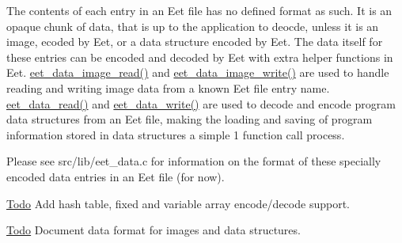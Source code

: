 The contents of each entry in an Eet file has no defined format as such. It is an opaque chunk of data, that is up to the application to deocde, unless it is an image, ecoded by Eet, or a data structure encoded by Eet. The data itself for these entries can be encoded and decoded by Eet with extra helper functions in Eet. \hyperlink{Eet_8h_986872ec682c29f842b2ef6dad810257}{eet\_\-data\_\-image\_\-read()} and \hyperlink{Eet_8h_b4e8a3419744fac22bca24af533f5051}{eet\_\-data\_\-image\_\-write()} are used to handle reading and writing image data from a known Eet file entry name. \hyperlink{Eet_8h_4d1807cbbc448304f22a8808318a3429}{eet\_\-data\_\-read()} and \hyperlink{Eet_8h_c66d1c49e3490bc5d803982d833ff8aa}{eet\_\-data\_\-write()} are used to decode and encode program data structures from an Eet file, making the loading and saving of program information stored in data structures a simple 1 function call process.

Please see src/lib/eet\_\-data.c for information on the format of these specially encoded data entries in an Eet file (for now).

\begin{Desc}
\item[\hyperlink{todo__todo000001}{Todo}]Add hash table, fixed and variable array encode/decode support. \end{Desc}
\begin{Desc}
\item[\hyperlink{todo__todo000001}{Todo}]Document data format for images and data structures.\end{Desc}
